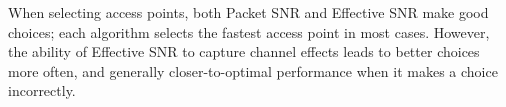  When selecting access points, both Packet SNR and Effective SNR make good choices; each algorithm selects the fastest access point in most cases. However, the ability of Effective SNR to capture channel effects leads to better choices more often, and generally closer-to-optimal performance when it makes a choice incorrectly.


